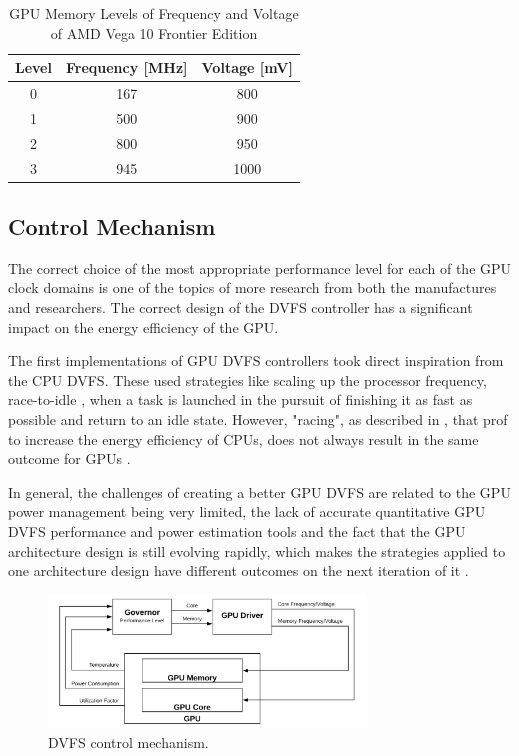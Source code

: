 \begin{table}[!htb]
\renewcommand{\arraystretch}{1.2} %
\centering
\begin{tabular}{ccc}
\textbf{Level} & \textbf{Frequency {[}MHz{]}} & \textbf{Voltage {[}mV{]}} \\ \hline
0              & 167                          & 800                       \\
1              & 500                          & 900                       \\
2              & 800                          & 950                       \\
3              & 945                          & 1000                      \\ \hline
\end{tabular}
\caption{GPU Memory Levels of Frequency and Voltage of AMD Vega 10 Frontier Edition}
\label{tab:gpumemlevels}
\end{table}

\subsection{Control Mechanism}

The correct choice of the most appropriate performance level for each of the GPU clock domains is one of the topics of more research from both the manufactures and researchers. The correct design of the DVFS controller has a significant impact on the energy efficiency of the GPU.

The first implementations of GPU DVFS controllers took direct inspiration from the CPU DVFS. These used strategies like scaling up the processor frequency, race-to-idle \cite{hoffmann_racing_2013}, when a task is launched in the pursuit of finishing it as fast as possible and return to an idle state. However, "racing", as described in \cite{kim_racing_2015}, that prof to increase the energy efficiency of CPUs, does not always result in the same outcome for GPUs \cite{kim_racing_2015}.

In general, the challenges of creating a better GPU DVFS are  related to the GPU power management being very limited, the lack of accurate quantitative GPU DVFS performance and power estimation tools and the fact that the GPU architecture design is still evolving rapidly, which makes the strategies applied to one architecture design have different outcomes on the next iteration of it \cite{mei_survey_2016}.


\begin{figure}[!htb]
  \centering
  \includegraphics[width=0.75\textwidth]{Figures/StateArt/DVFS.png}
  \caption[Controller]{DVFS control mechanism.}
  \label{fig:DVFSmechanism}
\end{figure}

